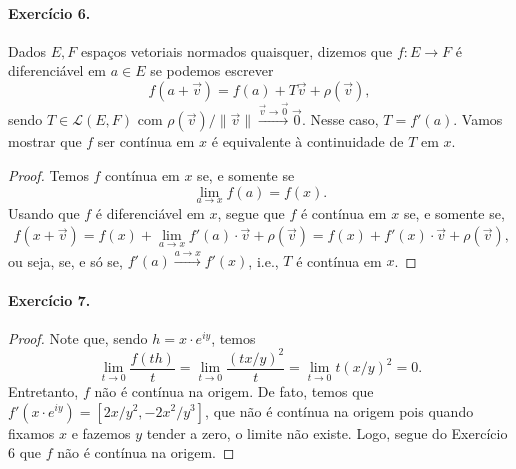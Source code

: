 \documentclass[12pt,a4paper]{article}
\begin{document}
\paragraph{Exercício 6.}
    Dados $E,F$ espaços vetoriais normados quaisquer, dizemos que $f:E\to F$ é diferenciável em $a\in E$ 
    se podemos escrever
    \begin{equation*}
        f(a+\vec{v}) = f(a) + T\vec{v} + \rho(\vec{v}),
    \end{equation*}
    sendo $T\in\mathcal{L}(E,F)$ com $\rho(\vec{v})/\|\vec{v}\| \xrightarrow{\vec{v}\to\vec{0}} \vec{0}$.
    Nesse caso, $T = f'(a)$. Vamos mostrar que $f$ ser contínua em $x$ é equivalente à continuidade de
    $T$ em $x$.
    \begin{proof}
        Temos $f$ contínua em $x$ se, e somente se
        \begin{equation*}
            \lim_{a\to x} f(a) = f(x).
        \end{equation*}
        Usando que $f$ é diferenciável em $x$, segue que $f$ é contínua em $x$ se, e somente se,
        \begin{align*}
            f(x+\vec{v}) 
            = f(x) + \lim_{a\to x} f'(a)\cdot\vec{v} + \rho(\vec{v}) 
            = f(x) + f'(x)\cdot\vec{v} + \rho(\vec{v}),
        \end{align*}
        ou seja, se, e só se, $f'(a) \xrightarrow{a\to x} f'(x)$, i.e., $T$ é contínua em $x$.
    \end{proof}
%
\paragraph{Exercício 7.}
    \begin{proof}
        Note que, sendo $h = x\cdot e^{iy}$, temos
        \begin{equation*}
            \lim_{t\to 0} \frac{f(th)}{t} = \lim_{t\to 0} \frac{(tx/y)^2}{t} = \lim_{t\to 0} t(x/y)^2 = 0.
        \end{equation*}
        Entretanto, $f$ não é contínua na origem. De fato, temos que $f'(x\cdot e^{iy})=[2x/y^2, -2x^2/y^3]$,
        que não é contínua na origem pois quando fixamos $x$ e fazemos $y$ tender a zero, o limite não existe.
        Logo, segue do Exercício 6 que $f$ não é contínua na origem.
    \end{proof}
%
\end{document}
